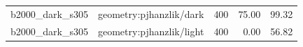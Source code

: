 \begin{longtable}{l>{\raggedright\arraybackslash}p{.42\linewidth}rrr}
b2000\_\allowbreak{}dark\_\allowbreak{}s305 & %
geometry:pjhanzlik/dark & %
400 & %
75.00 & %
99.32 \\ %

b2000\_\allowbreak{}dark\_\allowbreak{}s305 & %
geometry:pjhanzlik/light & %
400 & %
0.00 & %
56.82 \\ %


\end{longtable}

